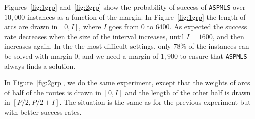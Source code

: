 \documentclass[a4paper,10pt]{article}
\newcommand\ASPMLS{\texttt{ASPMLS}\xspace}
\begin{document}
  Figures~\ref{fig:1grp} and~\ref{fig:2grp} show the probability of success of \ASPMLS  over $10,000$ instances as a function of the margin. In Figure~\ref{fig:1grp} the length of arcs are drawn in $[0,I]$, where $I$ goes from $0$ to $6400$. As expected the success rate decreases when the size of the interval increases, until $I = 1600$, and then increases again.  In the the most difficult settings, only $78\%$ of the instances can be solved with margin $0$, and we need a margin of $1,900$ to ensure that \ASPMLS always finds a solution.

  In Figure~\ref{fig:2grp}, we do the same experiment, except that the weights of arcs of half of the routes is drawn in $[0,I]$ and the length of the other half is drawn in $[P/2,P/2 + I]$. The situation is the same as for the previous experiment but with better success rates. 
  
\end{document}
